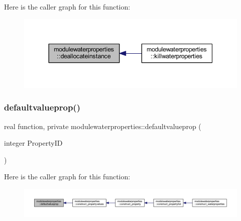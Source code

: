 Here is the caller graph for this function\+:\nopagebreak
\begin{figure}[H]
\begin{center}
\leavevmode
\includegraphics[width=344pt]{namespacemodulewaterproperties_afcf00b3b04c6e13ebfe955c7074bc924_icgraph}
\end{center}
\end{figure}
\mbox{\label{namespacemodulewaterproperties_a3a9b963326300338acf15af3b6edcdae}} 
\subsubsection{\texorpdfstring{defaultvalueprop()}{defaultvalueprop()}}
{\footnotesize\ttfamily real function, private modulewaterproperties\+::defaultvalueprop (\begin{DoxyParamCaption}\item[{integer}]{Property\+ID }\end{DoxyParamCaption})\hspace{0.3cm}{\ttfamily [private]}}

Here is the caller graph for this function\+:\nopagebreak
\begin{figure}[H]
\begin{center}
\leavevmode
\includegraphics[width=350pt]{namespacemodulewaterproperties_a3a9b963326300338acf15af3b6edcdae_icgraph}
\end{center}
\end{figure}
\mbox{\label{namespacemodulewaterproperties_a60f5e5b09c032f11f1b1a75f101398a0}} 
